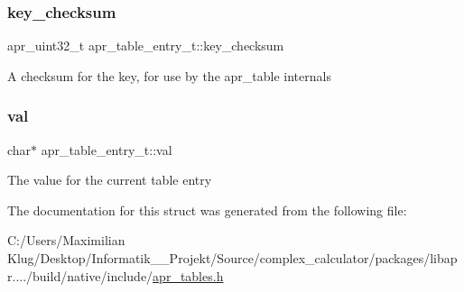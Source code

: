 \subsubsection{\texorpdfstring{key\+\_\+checksum}{key\_checksum}}
{\footnotesize\ttfamily apr\+\_\+uint32\+\_\+t apr\+\_\+table\+\_\+entry\+\_\+t\+::key\+\_\+checksum}

A checksum for the key, for use by the apr\+\_\+table internals \mbox{\label{structapr__table__entry__t_a755371d0aa6a9487b502c34807271e6f}} 
\subsubsection{\texorpdfstring{val}{val}}
{\footnotesize\ttfamily char$\ast$ apr\+\_\+table\+\_\+entry\+\_\+t\+::val}

The value for the current table entry 

The documentation for this struct was generated from the following file\+:\begin{DoxyCompactItemize}
\item 
C\+:/\+Users/\+Maximilian Klug/\+Desktop/\+Informatik\+\_\+\_\+\+Projekt/\+Source/complex\+\_\+calculator/packages/libapr..../build/native/include/\mbox{\hyperlink{apr__tables_8h}{apr\+\_\+tables.\+h}}\end{DoxyCompactItemize}
